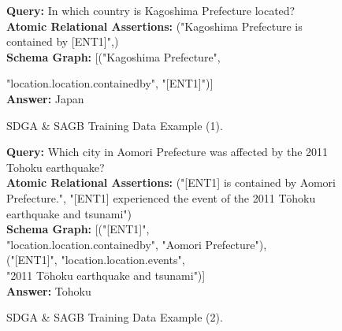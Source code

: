 \documentclass[11pt]{article}
\begin{document}
\begin{figure}[H]
    \centering
    \footnotesize
    \begin{tcolorbox}[
        title={Example (1)},      %
        colback=gray!5,                        %
        colframe=gray!60,                  %
        coltitle=white,                       %
        fonttitle=\small\bfseries,            %
        boxrule=0.8pt,                        %
        left=2mm, right=2mm, top=2mm, bottom=2mm, %
        arc=1mm,                              %
        width=\columnwidth                      %
    ]
    
    \textbf{Query:} In which country is Kagoshima Prefecture located? \\
    \textbf{Atomic Relational Assertions:} ("Kagoshima Prefecture is contained by [ENT1]",) \\
    \textbf{Schema Graph:} [("Kagoshima Prefecture",  
    
    "location.location.containedby", "[ENT1]")] \\
    \textbf{Answer:} Japan
    \end{tcolorbox}
    \caption{SDGA \& SAGB Training Data Example (1).}
    \label{fig:t1}
\end{figure}

\begin{figure}[H]
    \centering
    \footnotesize
    \begin{tcolorbox}[
        title={Example (2)},      %
        colback=gray!5,                        %
        colframe=gray!60,                  %
        coltitle=white,                       %
        fonttitle=\small\bfseries,            %
        boxrule=0.8pt,                        %
        left=2mm, right=2mm, top=2mm, bottom=2mm, %
        arc=1mm,                              %
        width=\columnwidth                      %
    ]
    
    \textbf{Query:} Which city in Aomori Prefecture was affected by the 2011 Tohoku earthquake? \\
    \textbf{Atomic Relational Assertions:} ("[ENT1] is contained by Aomori Prefecture.", "[ENT1] experienced the event of the 2011 Tōhoku earthquake and tsunami") \\
    \textbf{Schema Graph:} [("[ENT1]",  \\
    "location.location.containedby", "Aomori Prefecture"), \\
    ("[ENT1]", "location.location.events", \\
    "2011 Tōhoku earthquake and tsunami")]  \\
    \textbf{Answer:} Tohoku
    \end{tcolorbox}
    \caption{SDGA \& SAGB Training Data Example (2).}
    \label{fig:t2}
\end{figure}
\end{document}
